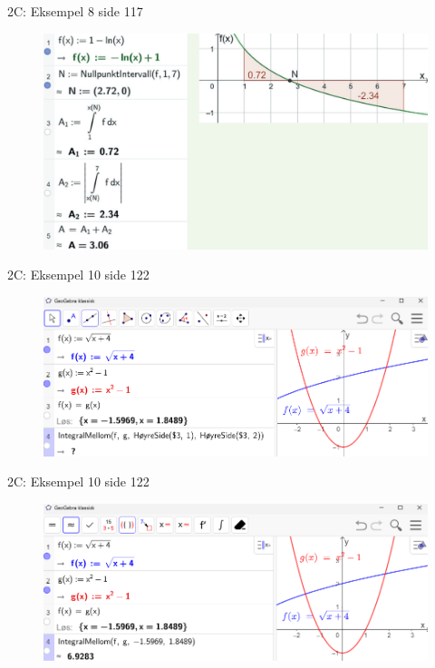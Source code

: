 \greenheader\begin{frame}{2C: Eksempel 8 side 117}
\begin{figure}
    \centering
    \includegraphics[width=0.9\linewidth]{R2-K2C-3.png}
\end{figure}
\end{frame}

\greenheader\begin{frame}{2C: Eksempel 10 side 122}
\begin{figure}
    \centering
    \includegraphics[width=\linewidth]{R2-K2C-4.png}
\end{figure}
\end{frame}

\greenheader\begin{frame}{2C: Eksempel 10 side 122}
\begin{figure}
    \centering
    \includegraphics[width=\linewidth]{R2-K2C-5.png}
\end{figure}
\end{frame}

